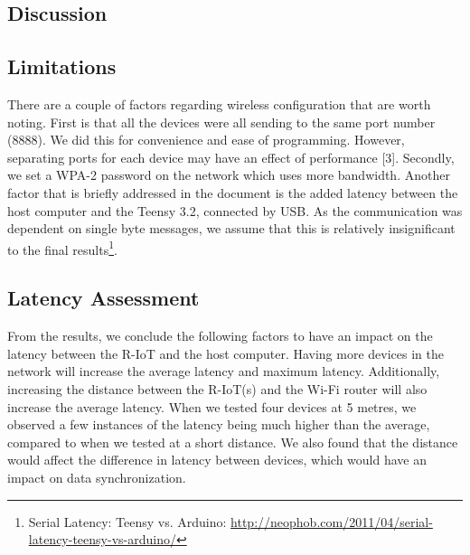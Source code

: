 

\subsection{Discussion}

\subsection{Limitations}
There are a couple of factors regarding wireless configuration that are worth noting. First is that all the devices were all sending to the same port number (8888). We did this for convenience and ease of programming. However, separating ports for each device may have an effect of performance [3]. Secondly, we set a WPA-2 password on the network which uses more bandwidth. Another factor that is briefly addressed in the document is the added latency between the host computer and the Teensy 3.2, connected by USB. As the communication was dependent on single byte messages, we assume that this is relatively insignificant to the final results\footnote{Serial Latency: Teensy vs. Arduino: \url{http://neophob.com/2011/04/serial-latency-teensy-vs-arduino/}}.

\subsection{Latency Assessment}

From the results, we conclude the following factors to have an impact on the latency between the R-IoT and the host computer. Having more devices in the network will increase the average latency and maximum latency. Additionally, increasing the distance between the R-IoT(s) and the Wi-Fi router will also increase the average latency. When we tested four devices at 5 metres, we observed a few instances of the latency being much higher than the average, compared to when we tested at a short distance. We also found that the distance would affect the difference in latency between devices, which would have an impact on data synchronization.
